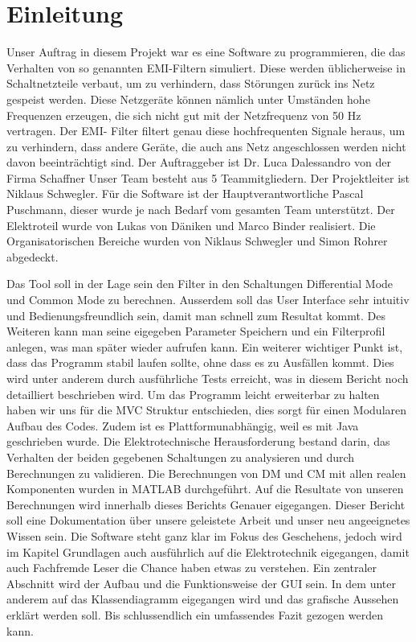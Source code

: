 \section{Einleitung} \label{sec:einleitung}
Unser Auftrag in diesem Projekt war es eine Software zu programmieren, die das Verhalten von so genannten EMI-Filtern simuliert. Diese werden üblicherweise in Schaltnetzteile verbaut, um zu verhindern, dass Störungen zurück ins Netz gespeist werden. Diese Netzgeräte können nämlich unter Umständen hohe Frequenzen erzeugen, die sich nicht gut mit der Netzfrequenz von 50 Hz vertragen. Der EMI- Filter filtert genau diese hochfrequenten Signale heraus, um zu verhindern, dass andere  Geräte, die auch ans Netz angeschlossen werden nicht davon beeinträchtigt sind.
Der Auftraggeber ist Dr. Luca Dalessandro von der Firma Schaffner 
Unser Team besteht aus 5 Teammitgliedern. Der Projektleiter ist Niklaus Schwegler. Für die Software ist der Hauptverantwortliche Pascal Puschmann, dieser wurde je nach Bedarf vom gesamten Team unterstützt. Der Elektroteil wurde von Lukas von Däniken und Marco Binder realisiert. Die Organisatorischen Bereiche wurden von Niklaus Schwegler und Simon Rohrer abgedeckt.

Das Tool soll in der Lage sein den Filter in den Schaltungen Differential Mode und Common Mode zu berechnen. Ausserdem soll das User Interface sehr intuitiv und Bedienungsfreundlich sein, damit man schnell zum Resultat kommt. Des Weiteren kann man seine eigegeben Parameter Speichern und ein Filterprofil anlegen, was man später wieder aufrufen kann. Ein weiterer wichtiger Punkt ist, dass das Programm stabil laufen sollte, ohne dass es zu Ausfällen kommt. Dies wird unter anderem durch ausführliche Tests erreicht, was in diesem Bericht noch detailliert beschrieben wird. 
Um das Programm leicht erweiterbar zu halten haben wir uns für die MVC Struktur entschieden, dies sorgt für einen Modularen Aufbau des Codes. Zudem ist es Plattformunabhängig, weil es mit Java geschrieben wurde.
Die Elektrotechnische Herausforderung bestand darin, das Verhalten der beiden gegebenen Schaltungen zu analysieren und durch Berechnungen zu validieren. 
Die Berechnungen von DM und CM mit allen realen Komponenten wurden in MATLAB durchgeführt.
Auf die Resultate von unseren Berechnungen wird innerhalb dieses Berichts Genauer eigegangen.  
Dieser Bericht soll eine Dokumentation über unsere geleistete Arbeit und unser neu angeeignetes Wissen sein. 
Die Software steht ganz klar im Fokus des Geschehens, jedoch wird im Kapitel Grundlagen auch ausführlich auf die Elektrotechnik eigegangen, damit auch Fachfremde Leser die Chance haben etwas zu verstehen. 
Ein zentraler Abschnitt wird der Aufbau und die Funktionsweise der GUI sein. In dem unter anderem auf das Klassendiagramm eigegangen wird und das grafische Aussehen erklärt werden soll. 
Bis schlussendlich ein umfassendes Fazit gezogen werden kann. 



